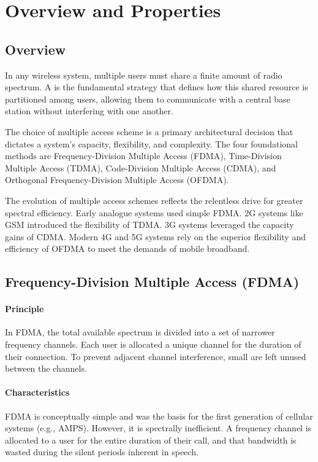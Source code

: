 \section{Overview and Properties}

\subsection{Overview}

In any wireless system, multiple users must share a finite amount of radio spectrum. A  is the fundamental strategy that defines how this shared resource is partitioned among users, allowing them to communicate with a central base station without interfering with one another.

The choice of multiple access scheme is a primary architectural decision that dictates a system's capacity, flexibility, and complexity. The four foundational methods are Frequency-Division Multiple Access (FDMA), Time-Division Multiple Access (TDMA), Code-Division Multiple Access (CDMA), and Orthogonal Frequency-Division Multiple Access (OFDMA).

\begin{keyconcept}
    The evolution of multiple access schemes reflects the relentless drive for greater spectral efficiency. Early analogue systems used simple FDMA. 2G systems like GSM introduced the flexibility of TDMA. 3G systems leveraged the capacity gains of CDMA. Modern 4G and 5G systems rely on the superior flexibility and efficiency of OFDMA to meet the demands of mobile broadband.
\end{keyconcept}

\subsection{Frequency-Division Multiple Access (FDMA)}

\paragraph{Principle}
In FDMA, the total available spectrum is divided into a set of narrower frequency channels. Each user is allocated a unique channel for the duration of their connection. To prevent adjacent channel interference, small  are left unused between the channels.

\paragraph{Characteristics}
FDMA is conceptually simple and was the basis for the first generation of cellular systems (e.g., AMPS). However, it is spectrally inefficient. A frequency channel is allocated to a user for the entire duration of their call, and that bandwidth is wasted during the silent periods inherent in speech.

